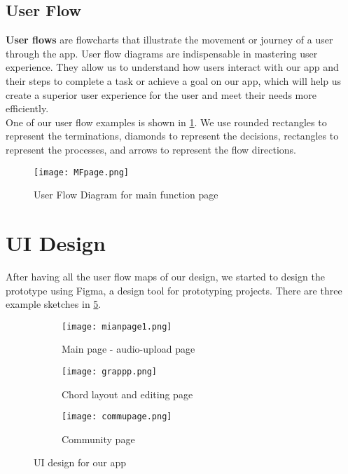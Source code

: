 \subsection{User Flow}
 \textbf{User flows} are flowcharts that illustrate the movement or journey of a user through the app. User flow diagrams are indispensable in mastering user experience. 
 They allow us to understand how users interact with our app and their steps to complete a task or achieve a goal on our app, 
 which will help us create a superior user experience for the user and meet their needs more efficiently. 
 \\One of our user flow examples is shown in \cref{flowchartmain}.
 We use rounded rectangles to represent the terminations, diamonds to represent the decisions, rectangles to represent the processes, and arrows to represent the flow directions.

\begin{figure}[ht]
\centering
\texttt{[image: MFpage.png]}
\caption{User Flow Diagram for main function page}
\label{flowchartmain}
\end{figure}
\section{UI Design}
After having all the user flow maps of our design, we started to design the prototype using Figma, a design tool for prototyping projects. 
There are three example sketches in \cref{fig:UIdesign}. 

\begin{figure}[ht]
     \centering
     \hspace{16mm}
     \begin{subfigure}[b]{0.2\textwidth}
         \centering
         \texttt{[image: mianpage1.png]}
         \caption{Main page - audio-upload page}
         \label{Mainpage}
     \end{subfigure}
     \hfill
     \begin{subfigure}[b]{0.2\textwidth}
         \centering
         \texttt{[image: grappp.png]}
         \caption{Chord layout and editing page}
         \label{chordedit}
     \end{subfigure}
     \hfill
     \begin{subfigure}[b]{0.2\textwidth}
         \centering
         \texttt{[image: commupage.png]}
         \caption{Community page}
         \label{Community page}
     \end{subfigure}
     \hspace{16mm}
        \caption{UI design for our app}
        \label{fig:UIdesign}
\end{figure}


